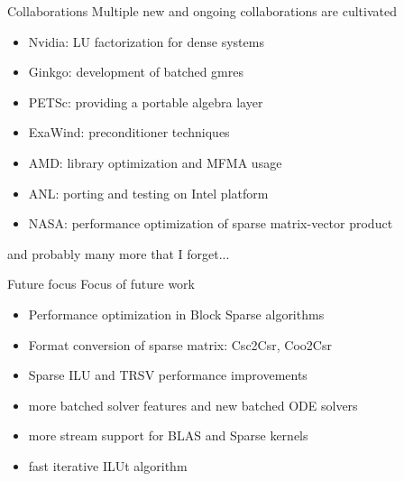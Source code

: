 \begin{frame}[fragile]{Collaborations}
Multiple new and ongoing collaborations are cultivated
\begin{itemize}
  \item Nvidia: LU factorization for dense systems
  \item Ginkgo: development of batched gmres
  \item PETSc: providing a portable algebra layer
  \item ExaWind: preconditioner techniques
  \item AMD: library optimization and MFMA usage
  \item ANL: porting and testing on Intel platform
  \item NASA: performance optimization of sparse matrix-vector product
\end{itemize}
and probably many more that I forget...
\end{frame}

\begin{frame}[fragile]{Future focus}
Focus of future work
\begin{itemize}
  \item Performance optimization in Block Sparse algorithms
  \item Format conversion of sparse matrix: Csc2Csr, Coo2Csr
  \item Sparse ILU and TRSV performance improvements
  \item more batched solver features and new batched ODE solvers
  \item more stream support for BLAS and Sparse kernels
  \item fast iterative ILUt algorithm
\end{itemize}
\end{frame}
